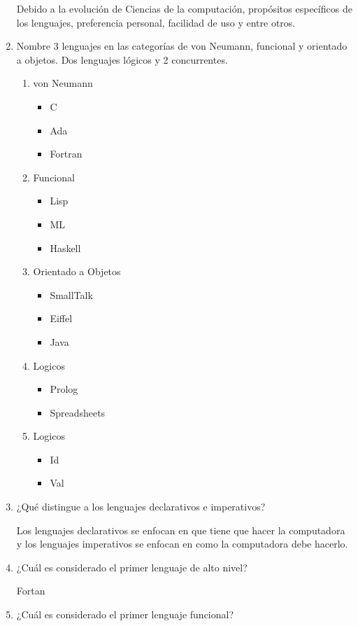 \documentclass{article}
\begin{document}
\begin{enumerate}
Debido a la evolución de Ciencias de la computación, propósitos específicos de los lenguajes, preferencia personal, facilidad de uso y entre otros.
\newpage
\item Nombre 3 lenguajes en las categorías de von Neumann, funcional y orientado a objetos. Dos lenguajes lógicos y 2 concurrentes.	
	\begin{enumerate}	
	\item von Neumann
	\begin{itemize}
	\item C
	\item Ada
	\item Fortran
	\end{itemize}
	\item Funcional
	\begin{itemize}
	\item Lisp
	\item ML
	\item Haskell
	\end{itemize}
	\item Orientado a Objetos
	\begin{itemize}
	\item SmallTalk
	\item Eiffel
	\item Java
	\end{itemize}
	\item Logicos
	\begin{itemize}
	\item Prolog
	\item Spreadsheets
	\end{itemize}
		\item Logicos
	\begin{itemize}
	\item Id
	\item Val
	\end{itemize}
	\end{enumerate}
	\item ¿Qué distingue a los lenguajes declarativos e imperativos?
	
	Los lenguajes declarativos se enfocan en que tiene que hacer la computadora y los lenguajes imperativos se enfocan en como la computadora debe hacerlo.
	
	\item ¿Cuál es considerado el primer lenguaje de alto nivel?
	
	Fortan
	
	\item ¿Cuál es considerado el primer lenguaje funcional?
	

\end{enumerate}
\end{document}
